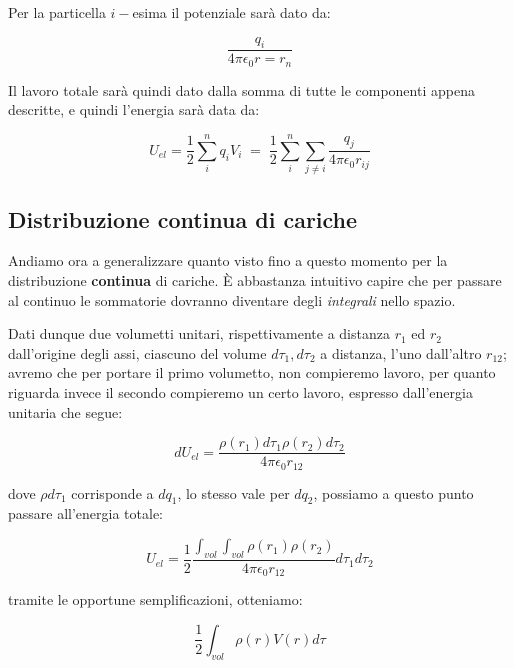 Per la particella $i-$esima il potenziale sarà dato da: 

$$
\frac{q_i}{4\pi\epsilon_0r=r_n}
$$

Il lavoro totale sarà quindi dato dalla somma di tutte le componenti appena descritte, e quindi l'energia sarà data da: 

\begin{large}
	\begin{equation} \label{eq_energia_sistema_discreto}
		U_{el} = \frac{1}{2} \sum_i^n q_iV_i \; = \;  \frac{1}{2}\sum_i ^n\sum_{j \ne i}\frac{q_j}{4\pi\epsilon_0r_{ij}}
	\end{equation}
\end{large}

\subsection{Distribuzione continua di cariche}
Andiamo ora a generalizzare quanto visto fino a questo momento per la distribuzione \textbf{continua} di cariche. È abbastanza intuitivo capire che per passare al continuo le sommatorie dovranno diventare degli \textit{integrali} nello spazio. 

Dati dunque due volumetti unitari, rispettivamente a distanza $r_1$ ed $r_2$ dall'origine degli assi, ciascuno del volume $d\tau_1, d\tau_2$ a distanza, l'uno dall'altro $r_{12}$; avremo che per portare il primo volumetto, non compieremo lavoro, per quanto riguarda invece il secondo compieremo un certo lavoro, espresso dall'energia unitaria che segue: 

$$
dU_{el} = \frac{\rho (r_1) d\tau_1\rho(r_2)d\tau_2}{4\pi\epsilon_0r_{12}}
$$

dove $\rho d\tau_1$ corrisponde a $dq_1$, lo stesso vale per $dq_2$, possiamo a questo punto passare all'energia totale: 

\begin{large}
	\begin{equation} \label{eq_energia_sistema_continuo}
		U_{el} = \frac{1}{2} \frac{\int_{vol}\int_{vol} \rho(r_1) \rho(r_2)}{4\pi\epsilon_0r_{12}} d\tau_1 d\tau_2
	\end{equation}
\end{large}

tramite le opportune semplificazioni, otteniamo: 

\begin{large}
	\begin{equation} \label{eq_energia_sistema_continuo_semplificata}
		\frac{1}{2} \int_{vol} \rho(r) V(r) d\tau
	\end{equation}
\end{large}

